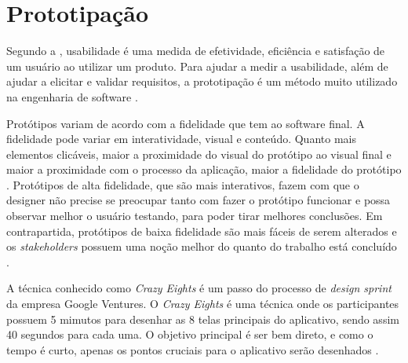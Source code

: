 \section{Prototipação}

Segundo a , usabilidade é uma medida de efetividade, eficiência e satisfação de um usuário ao utilizar um produto. Para ajudar a medir a usabilidade, além de ajudar a elicitar e validar requisitos, a prototipação é um método muito utilizado na engenharia de software \cite{sommerville}.

Protótipos variam de acordo com a fidelidade que tem ao software final. A fidelidade pode variar em interatividade, visual e conteúdo. Quanto mais elementos clicáveis, maior a proximidade do visual do protótipo ao visual final e maior a proximidade com o processo da aplicação, maior a fidelidade do protótipo \cite{nielsen}. Protótipos de alta fidelidade, que são mais interativos, fazem com que o designer não precise se preocupar tanto com fazer o protótipo funcionar e possa observar melhor o usuário testando, para poder tirar melhores conclusões. Em contrapartida, protótipos de baixa fidelidade são mais fáceis de serem alterados e os \textit{stakeholders} possuem uma noção melhor do quanto do trabalho está concluído \cite{nielsen}.

A técnica conhecido como \textit{Crazy Eights} é um passo do processo de \textit{design sprint} da empresa Google Ventures. O \textit{Crazy Eights} é uma técnica onde os participantes possuem 5 mimutos para desenhar as 8 telas principais do aplicativo, sendo assim 40 segundos para cada uma. O objetivo principal é ser bem direto, e como o tempo é curto, apenas os pontos cruciais para o aplicativo serão desenhados \cite{knapp}.

